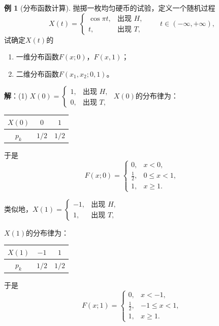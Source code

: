 \documentclass[11pt,a4paper]{report}
\theoremstyle{definition}
\newtheorem{example}{例}[chapter]
\begin{document}
\begin{example}[分布函数计算]
抛掷一枚均匀硬币的试验，定义一个随机过程
\[
X(t)=
\begin{cases}
\cos\pi t, & \text{出现 }H,\\
t, & \text{出现 }T,
\end{cases}
\qquad t\in(-\infty,+\infty),
\]
试确定$X(t)$的
\begin{enumerate}[label=(\arabic*)]
    \item 一维分布函数$F(x;0)$，$F(x,1)$；
    \item 二维分布函数$F(x_1,x_2;0,1)$。
\end{enumerate}

\textbf{解}：(1) $X(0)=
\begin{cases}
1, & \text{出现 }H,\\
0, & \text{出现 }T,
\end{cases}$
$X(0)$的分布律为：
\begin{table}[htbp]
\centering
\begin{tabular}{@{}ccc@{}}
\toprule
$X(0)$ & $0$ & $1$ \\
\midrule
$p_k$ & $1/2$ & $1/2$ \\
\bottomrule
\end{tabular}
\end{table}

于是
\[
F(x;0)=
\begin{cases}
0, & x<0,\\
\frac{1}{2}, & 0\leq x<1,\\
1, & x\geq1.
\end{cases}
\]

类似地，$X(1)=
\begin{cases}
-1, & \text{出现 }H,\\
1, & \text{出现 }T,
\end{cases}$

$X(1)$的分布律为：
\begin{table}[htbp]
\centering
\begin{tabular}{@{}ccc@{}}
\toprule
$X(1)$ & $-1$ & $1$ \\
\midrule
$p_k$ & $1/2$ & $1/2$ \\
\bottomrule
\end{tabular}
\end{table}

于是
\[
F(x;1)=
\begin{cases}
0, & x<-1,\\
\frac{1}{2}, & -1\leq x<1,\\
1, & x\geq1.
\end{cases}
\]


\end{example}
\end{document}
